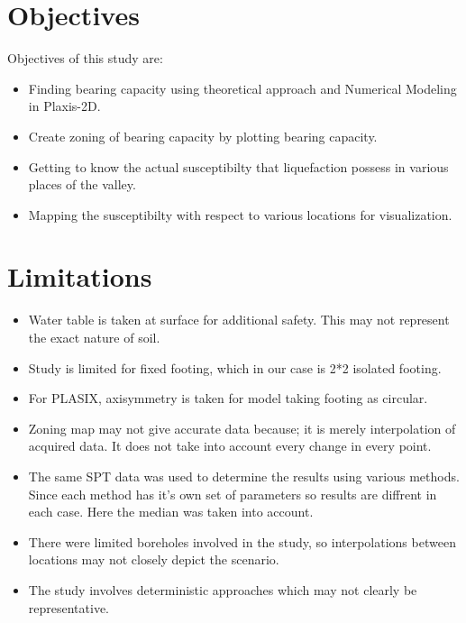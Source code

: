 \section{Objectives}
Objectives of this study are:
\begin{itemize}
  \item	Finding bearing capacity using theoretical approach and Numerical Modeling in Plaxis-2D.
  \item	Create zoning of bearing capacity by plotting bearing capacity.
  \item	Getting to know the actual susceptibilty that liquefaction possess in various places of the valley.
  \item	Mapping the susceptibilty with respect to various locations for visualization.  
\end{itemize}

\section{Limitations}
\begin{itemize}
  \item	Water table is taken at surface for additional safety. This may not represent the exact nature of soil.
  \item	Study is limited for fixed footing, which in our case is 2*2 isolated footing.
  \item For PLASIX, axisymmetry is taken for model taking footing as circular.
  \item	Zoning map may not give accurate data because; it is merely interpolation of acquired data. It does not take into account every change in every point.
  \item The same SPT data was used to determine the results using various methods. Since each method has it's own set of parameters so results are diffrent in each case. Here the median was taken into account.
  \item	There were limited boreholes involved in the study, so interpolations between locations may not closely depict the scenario.
  \item	The study involves deterministic approaches which may not clearly be representative.
\end{itemize}